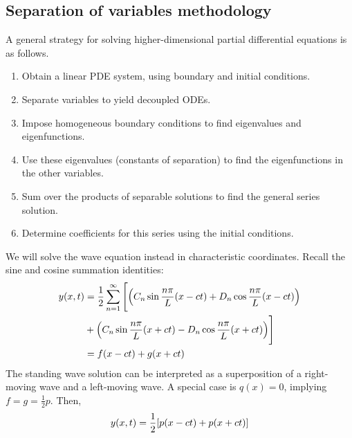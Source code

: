 \subsection{Separation of variables methodology}
A general strategy for solving higher-dimensional partial differential equations is as follows.
\begin{enumerate}
	\item Obtain a linear PDE system, using boundary and initial conditions.
	\item Separate variables to yield decoupled ODEs.
	\item Impose homogeneous boundary conditions to find eigenvalues and eigenfunctions.
	\item Use these eigenvalues (constants of separation) to find the eigenfunctions in the other variables.
	\item Sum over the products of separable solutions to find the general series solution.
	\item Determine coefficients for this series using the initial conditions.
\end{enumerate}
\begin{example}
	We will solve the wave equation instead in characteristic coordinates.
	Recall the sine and cosine summation identities:
	\begin{align*}
		y(x,t) & = \frac{1}{2} \sum_{n=1}^\infty \Bigg[ \qty(C_n \sin \frac{n \pi}{L}(x-ct) + D_n \cos \frac{n \pi}{L}(x-ct)) \\&
		+ \qty(C_n \sin \frac{n \pi}{L}(x+ct) - D_n \cos \frac{n \pi}{L}(x+ct)) \Bigg]                                        \\
		       & = f(x-ct) + g(x+ct)
	\end{align*}
	The standing wave solution can be interpreted as a superposition of a right-moving wave and a left-moving wave.
	A special case is \( q(x) = 0 \), implying \( f = g = \frac{1}{2} p \).
	Then,
	\[
		y(x,t) = \frac{1}{2}\qty[p(x-ct) + p(x+ct)]
	\]
\end{example}

